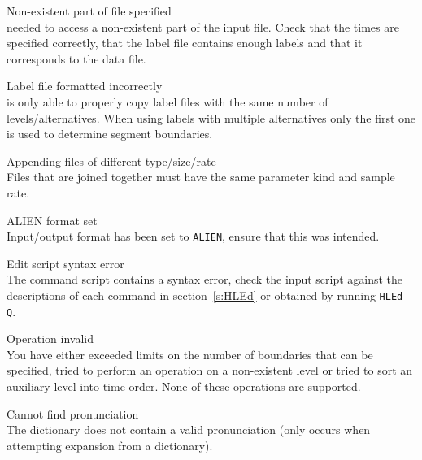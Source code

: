 \begin{itemize}


\begin{itemize}
    Non-existent part of file specified\\
         needed to access a non-existent part of the input file.
        Check that the times are specified correctly, that the label file
        contains enough labels and that it corresponds to the data file.

 Label file formatted incorrectly\\
         is only able to properly copy label files with the
        same number of levels/alternatives.  When using labels with multiple
        alternatives only the first one is used to determine segment 
        boundaries.

    Appending files of different type/size/rate\\
        Files that are joined together must have the same parameter kind and 
        sample rate.

    ALIEN format set\\
        Input/output format has been set to \texttt{ALIEN}, ensure that 
        this was intended.

\end{itemize}



\begin{itemize}
    Edit script syntax error\\
        The  command script contains a syntax error, check the 
        input script against the descriptions of each command in 
        section~\ref{s:HLEd} or obtained by running \texttt{HLEd -Q}.

 Operation invalid\\
        You have either exceeded  limits on the number of 
        boundaries that can be specified, tried to perform an operation on 
        a non-existent level or tried to sort an auxiliary level into time 
        order.  None of these operations are supported.

    Cannot find pronunciation\\
        The dictionary does not contain a valid pronunciation (only occurs
        when attempting expansion from a dictionary).


\end{itemize}
\end{itemize}
